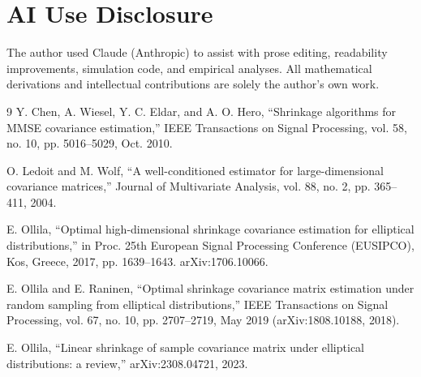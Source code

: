 \documentclass[10pt,twoside,titlepage]{article}
\begin{document}
\section*{AI Use Disclosure}
The author used Claude (Anthropic) to assist with prose editing,
readability improvements, simulation code, and empirical analyses.
All mathematical derivations and intellectual contributions are
solely the author's own work.

\begin{thebibliography}{9}
Y. Chen, A. Wiesel, Y. C. Eldar, and A. O. Hero, ``Shrinkage algorithms for MMSE covariance estimation,''
IEEE Transactions on Signal Processing, vol. 58, no. 10, pp. 5016--5029, Oct. 2010.

O. Ledoit and M. Wolf, ``A well-conditioned estimator for large-dimensional covariance matrices,''
Journal of Multivariate Analysis, vol. 88, no. 2, pp. 365--411, 2004.

E. Ollila, ``Optimal high-dimensional shrinkage covariance estimation for elliptical distributions,''
in Proc. 25th European Signal Processing Conference (EUSIPCO), Kos, Greece, 2017, pp. 1639--1643.
arXiv:1706.10066.

E. Ollila and E. Raninen, ``Optimal shrinkage covariance matrix estimation under random sampling
from elliptical distributions,''
IEEE Transactions on Signal Processing, vol. 67, no. 10, pp. 2707--2719, May 2019
(arXiv:1808.10188, 2018).

E. Ollila, ``Linear shrinkage of sample covariance matrix under elliptical distributions:
a review,'' arXiv:2308.04721, 2023.
\end{thebibliography}
\end{document}
